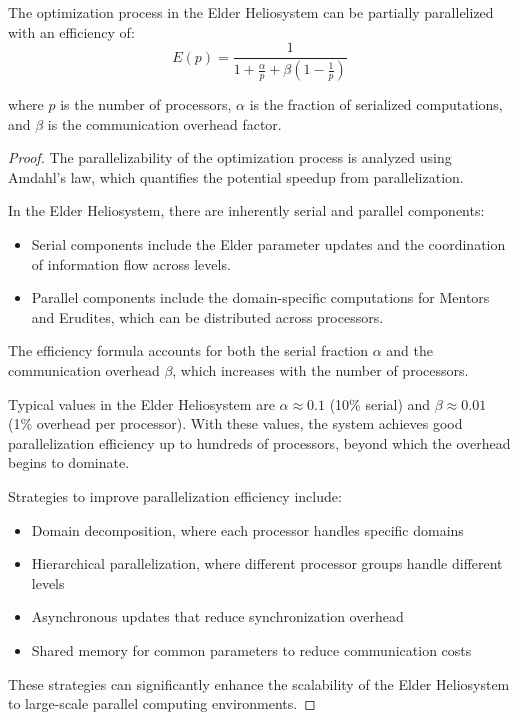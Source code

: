 \begin{theorem}
The optimization process in the Elder Heliosystem can be partially parallelized with an efficiency of:
\begin{equation}
E(p) = \frac{1}{1 + \frac{\alpha}{p} + \beta(1 - \frac{1}{p})}
\end{equation}

where $p$ is the number of processors, $\alpha$ is the fraction of serialized computations, and $\beta$ is the communication overhead factor.
\end{theorem}

\begin{proof}
The parallelizability of the optimization process is analyzed using Amdahl's law, which quantifies the potential speedup from parallelization.

In the Elder Heliosystem, there are inherently serial and parallel components:
\begin{itemize}
    \item Serial components include the Elder parameter updates and the coordination of information flow across levels.
    \item Parallel components include the domain-specific computations for Mentors and Erudites, which can be distributed across processors.
\end{itemize}

The efficiency formula accounts for both the serial fraction $\alpha$ and the communication overhead $\beta$, which increases with the number of processors.

Typical values in the Elder Heliosystem are $\alpha \approx 0.1$ (10\% serial) and $\beta \approx 0.01$ (1\% overhead per processor). With these values, the system achieves good parallelization efficiency up to hundreds of processors, beyond which the overhead begins to dominate.

Strategies to improve parallelization efficiency include:
\begin{itemize}
    \item Domain decomposition, where each processor handles specific domains
    \item Hierarchical parallelization, where different processor groups handle different levels
    \item Asynchronous updates that reduce synchronization overhead
    \item Shared memory for common parameters to reduce communication costs
\end{itemize}

These strategies can significantly enhance the scalability of the Elder Heliosystem to large-scale parallel computing environments.
\end{proof}

